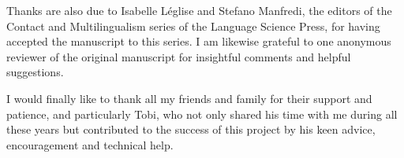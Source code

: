 Thanks are also due to Isabelle Léglise and Stefano Manfredi, the editors of the Contact and Multilingualism  series of the Language Science Press, for having accepted the manuscript to this series. I am likewise grateful to one anonymous reviewer of the original manuscript for insightful comments and helpful suggestions.

I would finally like to thank all my friends and family for their support and patience, and particularly Tobi, who not only shared his time with me during all these years but contributed to the success of this project by his keen advice, encouragement and technical help.